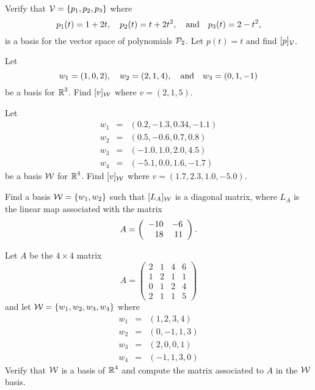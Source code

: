 \documentclass{ximera}
\begin{document}
\begin{exercise} \label{c7.1.4}
Verify that ${\cal V}= \{p_1,p_2,p_3\}$ where
\[
p_1(t)=1+2t, \quad p_2(t)=t+2t^2, \quad\mbox{and}\quad p_3(t)=2-t^2,
\]
is a basis for the vector space of polynomials ${\cal P}_2$.
Let $p(t)=t$ and find $[p]_{\cal V}$.
\end{exercise}

\CEXER


\begin{exercise} \label{c7.1.6}
Let
\[
w_1=(1,0,2), \quad w_2=(2,1,4), \quad\mbox{and}\quad w_3=(0,1,-1)
\]
be a basis for $\mbox{$\Bbb{R}$}^3$.  Find $[v]_{\cal W}$ where $v=(2,1,5)$.
\end{exercise}

\begin{exercise} \label{c7.1.7}
Let
\begin{equation*}
\begin{array}{ccl}
w_1 & = & (0.2,-1.3,0.34,-1.1)\\
w_2 & = & (0.5,-0.6,0.7,0.8)\\
w_3 & = & (-1.0,1.0,2.0,4.5) \\
w_4 & = & (-5.1,0.0,1.6,-1.7) \end{array}
\end{equation*}
be a basis ${\cal W}$ for $\mbox{$\Bbb{R}$}^4$.  Find $[v]_{\cal W}$ where
$v=(1.7,2.3,1.0,-5.0)$.
\end{exercise}

\begin{exercise} \label{c7.3.4}
Find a basis ${\cal W}=\{w_1,w_2\}$ such that $[L_A]_{\cal W}$ is
a diagonal matrix, where $L_A$ is the linear map associated with the
matrix
\[
A = \left(\begin{array}{rr} -10 & -6\\ 18 &11\end{array}\right).
\]
\end{exercise}

\begin{exercise} \label{c7.3.5}
Let $A$ be the $4\times 4$ matrix
\begin{equation*}
A = \left( \begin{array}{rrrr}
    2   &  1   &   4   &   6\\
     1  &    2   &   1  &    1\\
     0   &   1    &  2   &   4\\
     2    &  1   &   1   &   5
\end{array}\right)
\end{equation*}
and let ${\cal W}=\{w_1,w_2,w_3,w_4\}$ where
\begin{equation*}
\begin{array}{rcl}
w_1 & = &  ( 1, 2, 3, 4)  \\
w_2 & = &  ( 0,-1, 1, 3) \\
w_3 & = &  ( 2, 0, 0, 1) \\
w_4 & = &   (-1, 1,3, 0)
\end{array}
\end{equation*}
Verify that ${\cal W}$ is a basis of $\mbox{$\Bbb{R}$}^4$ and compute the
matrix associated to $A$ in the ${\cal W}$ basis.
\end{exercise}
\end{document}
